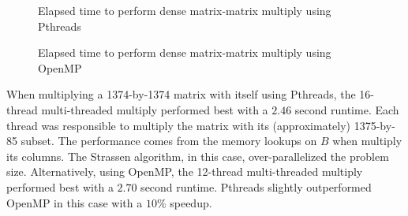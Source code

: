 \documentclass{article}
\begin{document}
\begin{figure}[h]      
	\centering 
    \hspace{10px}
    \hspace{10px}
    \caption{Elapsed time to perform dense matrix-matrix multiply using Pthreads}
    \label{materialflowChart}
    
    \centering 
    \hspace{10px}
    \hspace{10px}
    \caption{Elapsed time to perform dense matrix-matrix multiply using OpenMP}
    \label{materialflowChart}
\end{figure}

When multiplying a 1374-by-1374 matrix with itself using Pthreads, the 16-thread multi-threaded multiply performed  best with a $2.46$ second runtime. Each thread was responsible to multiply the matrix with its (approximately) 1375-by-85 subset.  The performance comes from the memory lookups on $B$ when multiply its columns. The Strassen algorithm, in this case, over-parallelized the problem size. Alternatively, using OpenMP, the 12-thread multi-threaded multiply performed best with a $2.70$ second runtime. Pthreads slightly outperformed OpenMP in this case with a $10\%$ speedup. \\
\end{document}
